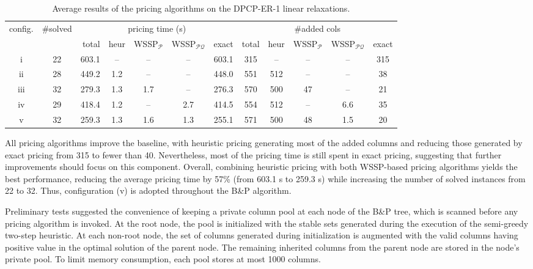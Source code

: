 \documentclass[preprint, 11pt, authoryear]{elsarticle}
\newcommand{\PP}{{\mathcal P}}
\newcommand{\QQ}{{\mathcal Q}}
\begin{document}
\begin{table}[]
\centering
\small
\setlength{\tabcolsep}{5pt}
\begin{tabular}{ccrccccccccc}
\toprule
config. & \#solved & \multicolumn{5}{c}{pricing time (s)} & \multicolumn{5}{c}{\#added cols} \\
\cmidrule(lr){3-7} \cmidrule(lr){8-12}
& & total & heur & WSSP$_{\PP}$ & WSSP$_{\PP\QQ}$ & exact & total & heur & WSSP$_{\PP}$ & WSSP$_{\PP\QQ}$ & exact \\
\midrule
i & 22 & 603.1 & -- & -- & -- & 603.1 & 315 & -- & -- & -- & 315 \\
ii & 28 & 449.2 & 1.2 & -- & -- & 448.0 & 551 & 512 & -- & -- & 38 \\
iii & 32 & 279.3 & 1.3 & 1.7 & -- & 276.3 & 570 & 500 & 47 & -- & 21 \\
iv & 29 & 418.4 & 1.2 & -- & 2.7 & 414.5 & 554 & 512 & -- & 6.6 & 35 \\
v & 32 & 259.3 & 1.3 & 1.6 & 1.3 & 255.1 & 571 & 500 & 48 & 1.5 & 20 \\
\bottomrule
\end{tabular}
\caption{Average results of the pricing algorithms on the DPCP-ER-1 linear relaxations.}
\label{table.results.column.generation}
\end{table}

All pricing algorithms improve the baseline, with heuristic pricing generating most of the added columns and reducing those generated by exact pricing from 315 to fewer than 40.
Nevertheless, most of the pricing time is still spent in exact pricing, suggesting that further improvements should focus on this component.
Overall, combining heuristic pricing with both WSSP-based pricing algorithms yields the best performance, reducing the average pricing time by 57\% (from 603.1 s to 259.3 s) while increasing the number of solved instances from 22 to 32. 
Thus, configuration (v) is adopted throughout the B\&P algorithm.

\medskip

Preliminary tests suggested the convenience of keeping a private column pool at each node of the B\&P tree, which 
is scanned before any pricing algorithm is invoked. 
At the root node, the pool is initialized with the stable sets generated during the execution of the semi-greedy two-step heuristic. 
At each non-root node, the set of columns generated during initialization is augmented with the valid columns having positive value in the optimal solution of the parent node.
The remaining inherited columns from the parent node are stored in the node's private pool. 
To limit memory consumption, each pool stores at most 1000 columns.
\end{document}
